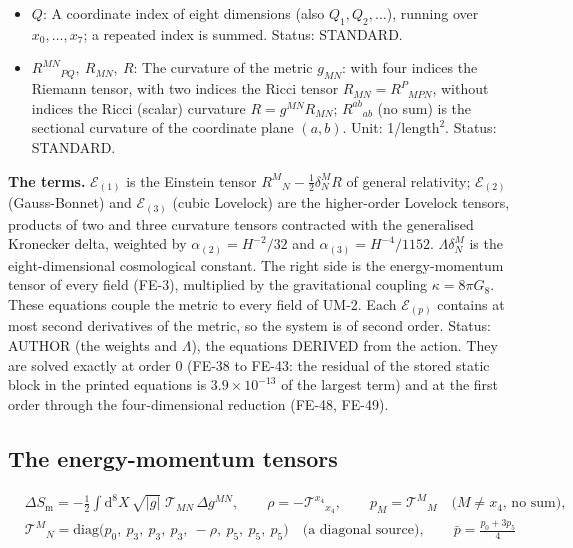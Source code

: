\documentclass[
  10pt,
]{article}
\begin{document}
\begin{itemize}
  \(P\): A coordinate index of eight dimensions (also
  \(P_1, P_2, \dots\)), running over \(x_0, \dots, x_7\); a repeated
  index is summed. Status: STANDARD.
\item
  \(Q\): A coordinate index of eight dimensions (also
  \(Q_1, Q_2, \dots\)), running over \(x_0, \dots, x_7\); a repeated
  index is summed. Status: STANDARD.
\item
  \(R^{MN}{}_{PQ},\ R_{MN},\ R\): The curvature of the metric
  \(g_{MN}\): with four indices the Riemann tensor, with two indices the
  Ricci tensor \(R_{MN} = R^P{}_{MPN}\), without indices the Ricci
  (scalar) curvature \(R = g^{MN}R_{MN}\); \(R^{ab}{}_{ab}\) (no sum) is
  the sectional curvature of the coordinate plane \((a, b)\). Unit:
  1/\(\mathrm{length}^{2}\). Status: STANDARD.
\end{itemize}

\textbf{The terms.} \(\mathcal{E}_{(1)}\) is the Einstein tensor
\(R^M{}_N - \frac12\delta^M_NR\) of general relativity;
\(\mathcal{E}_{(2)}\) (Gauss-Bonnet) and \(\mathcal{E}_{(3)}\) (cubic
Lovelock) are the higher-order Lovelock tensors, products of two and
three curvature tensors contracted with the generalised Kronecker delta,
weighted by \(\alpha_{(2)} = H^{-2}/32\) and
\(\alpha_{(3)} = H^{-4}/1152\). \(\Lambda\delta^M_N\) is the
eight-dimensional cosmological constant. The right side is the
energy-momentum tensor of every field (FE-3), multiplied by the
gravitational coupling \(\kappa = 8\pi G_8\). These equations couple the
metric to every field of UM-2. Each \(\mathcal{E}_{(p)}\) contains at
most second derivatives of the metric, so the system is of second order.
Status: AUTHOR (the weights and \(\Lambda\)), the equations DERIVED from
the action. They are solved exactly at order 0 (FE-38 to FE-43: the
residual of the stored static block in the printed equations is
\(3.9\times10^{-13}\) of the largest term) and at the first order
through the four-dimensional reduction (FE-48, FE-49).

\hypertarget{the-energy-momentum-tensors}{%
\subsection{The energy-momentum
tensors}\label{the-energy-momentum-tensors}}

\[
\begin{aligned}
&\Delta S_{\mathrm{m}} = -\frac12\int\mathrm{d}^8X\,\sqrt{\lvert g\rvert}\;\mathcal{T}_{MN}\,\Delta
 g^{MN},\qquad
 \rho = -\mathcal{T}^{x_4}{}_{x_4},\qquad p_M = \mathcal{T}^M{}_M\quad \text{($M \ne x_4$, no sum)},\\
&\mathcal{T}^M{}_N = \mathrm{diag}\big(p_0,\ p_3,\ p_3,\ p_3,\ -\rho,\ p_5,\ p_5,\ p_5\big)\quad
 \text{(a diagonal source)},\qquad \bar p = \frac{p_0 + 3p_5}{4}
\end{aligned} \tag{FE-2}
\]
\end{document}
